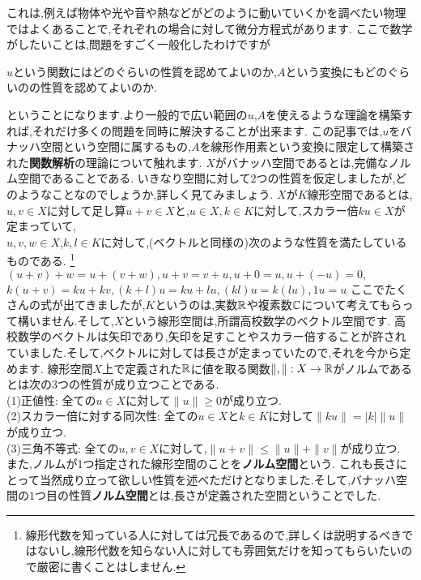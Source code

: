 これは,例えば物体や光や音や熱などがどのように動いていくかを調べたい物理ではよくあることで,それぞれの場合に対して微分方程式があります.
ここで数学がしたいことは,問題をすごく一般化したわけですが
\begin{center}
$u$という関数にはどのぐらいの性質を認めてよいのか,$A$という変換にもどのぐらいのの性質を認めてよいのか.
\end{center}
ということになります.より一般的で広い範囲の$u$,$A$を使えるような理論を構築すれば,それだけ多くの問題を同時に解決することが出来ます.
この記事では,$u$をバナッハ空間という空間に属するもの,$A$を線形作用素という変換に限定して構築された{\bf 関数解析}の理論について触れます.
$X$がバナッハ空間であるとは,完備なノルム空間であることである.
いきなり空間に対して$2$つの性質を仮定しましたが,どのようなことなのでしょうか,詳しく見てみましょう.
$X$が$K$線形空間であるとは,$u,v \in X$に対して足し算$u+v \in X$と,$u \in X, k \in K$に対して,スカラー倍$ku \in X$が定まっていて,\\
$u,v,w \in X$,$k,l \in K$に対して,(ベクトルと同様の)次のような性質を満たしているものである.
\footnote{線形代数を知っている人に対しては冗長であるので,詳しくは説明するべきではないし,線形代数を知らない人に対しても雰囲気だけを知ってもらいたいので厳密に書くことはしません.}\\
$ (u + v ) + w = u + (v + w) , u + v = v + u , u + 0 = u, u + (-u) = 0 ,$\\
$ k(u + v) = ku + kv , (k+l)u= ku + lu ,(kl)u = k(lu), 1u = u$
ここでたくさんの式が出てきましたが,$K$というのは,実数$\mathbb R$や複素数$\mathbb C$について考えてもらって構いません.そして,$X$という線形空間は,所謂高校数学のベクトル空間です.
高校数学のベクトルは矢印であり,矢印を足すことやスカラー倍することが許されていました.そして,ベクトルに対しては長さが定まっていたので,それを今から定めます.
線形空間$X$上で定義された$\mathbb R$に値を取る関数$\| , \| : X \to \mathbb R$がノルムであるとは次の$3$つの性質が成り立つことである.\\
(1)正値性: 全ての$u \in X$に対して$\| u \| \ge 0$が成り立つ.\\
(2)スカラー倍に対する同次性: 全ての$u \in X$と$k \in K$に対して$\| ku \| = |k| \| u\|$が成り立つ.\\
(3)三角不等式: 全ての$u,v \in X$に対して,$\|u+v \| \le \|u \| + \| v \|$が成り立つ.\\
また,ノルムが1つ指定された線形空間のことを{\bf ノルム空間}という.
これも長さにとって当然成り立って欲しい性質を述べただけとなりました.そして,バナッハ空間の$1$つ目の性質{\bf ノルム空間}とは,長さが定義された空間ということでした.\\
